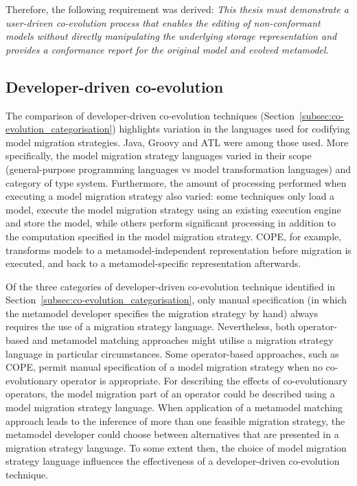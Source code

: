 Therefore, the following requirement was derived: \emph{This thesis must demonstrate a user-driven co-evolution process that enables the editing of non-conformant models without directly manipulating the underlying storage representation and provides a conformance report for the original model and evolved metamodel.}


\subsection{Developer-driven co-evolution}
The comparison of developer-driven co-evolution techniques (Section~\ref{subsec:co-evolution_categorisation}) highlights variation in the languages used for codifying model migration strategies. Java, Groovy and ATL were among those used. More specifically, the model migration strategy languages varied in their scope (general-purpose programming languages vs model transformation languages) and category of type system. Furthermore, the amount of processing performed when executing a model migration strategy also varied: some techniques only load a model, execute the model migration strategy using an existing execution engine and store the model, while others perform significant processing in addition to the computation specified in the model migration strategy. COPE, for example, transforms models to a metamodel-independent representation before migration is executed, and back to a metamodel-specific representation afterwards.

Of the three categories of developer-driven co-evolution technique identified in Section~\ref{subsec:co-evolution_categorisation}, only manual specification (in which the metamodel developer specifies the migration strategy by hand) always requires the use of a migration strategy language. Nevertheless, both operator-based and metamodel matching approaches might utilise a migration strategy language in particular circumstances. Some operator-based approaches, such as COPE, permit manual specification of a model migration strategy when no co-evolutionary operator is appropriate. For describing the effects of co-evolutionary operators, the model migration part of an operator could be described using a model migration strategy language. When application of a metamodel matching approach leads to the inference of more than one feasible migration strategy, the metamodel developer could choose between alternatives that are presented in a migration strategy language. To some extent then, the choice of model migration strategy language influences the effectiveness of a developer-driven co-evolution technique.  

